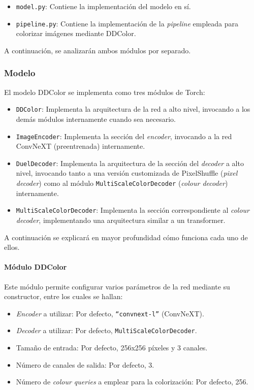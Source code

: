 \documentclass[a4paper]{article}
\begin{document}
\begin{itemize}
  \item{\texttt{model.py}: Contiene la implementación del modelo en sí.}
  \item{\texttt{pipeline.py}: Contiene la implementación de la \textit{pipeline} empleada para colorizar imágenes mediante DDColor.}
\end{itemize}

A continuación, se analizarán ambos módulos por separado.

\subsubsection{Modelo}

El modelo DDColor se implementa como tres módulos de Torch:

\begin{itemize}
  \item{\texttt{DDColor}: Implementa la arquitectura de la red a alto nivel, invocando a los demás módulos internamente cuando sea necesario.}
  \item{\texttt{ImageEncoder}: Implementa la sección del \textit{encoder}, invocando a la red ConvNeXT (preentrenada) internamente.}
  \item{\texttt{DuelDecoder}: Implementa la arquitectura de la sección del \textit{decoder} a alto nivel, invocando tanto a una versión customizada de PixelShuffle \cite{PixelShuffle} (\textit{pixel decoder}) como al módulo \texttt{MultiScaleColorDecoder} (\textit{colour decoder}) internamente.}
  \item{\texttt{MultiScaleColorDecoder}: Implementa la sección correspondiente al \textit{colour decoder}, implementando una arquitectura similar a un transformer.}
\end{itemize}

A continuación se explicará en mayor profundidad cómo funciona cada uno de ellos.

\paragraph{Módulo DDColor}

Este módulo permite configurar varios parámetros de la red mediante su constructor, entre los cuales se hallan:

\begin{itemize}
  \item{\textit{Encoder} a utilizar: Por defecto, \texttt{``convnext-l''} (ConvNeXT).}
  \item{\textit{Decoder} a utilizar: Por defecto, \texttt{MultiScaleColorDecoder}.}
  \item{Tamaño de entrada: Por defecto, 256x256 píxeles y 3 canales.}
  \item{Número de canales de salida: Por defecto, 3.}
  \item{Número de \textit{colour queries} a emplear para la colorización: Por defecto, 256.}
\end{itemize}
\end{document}
